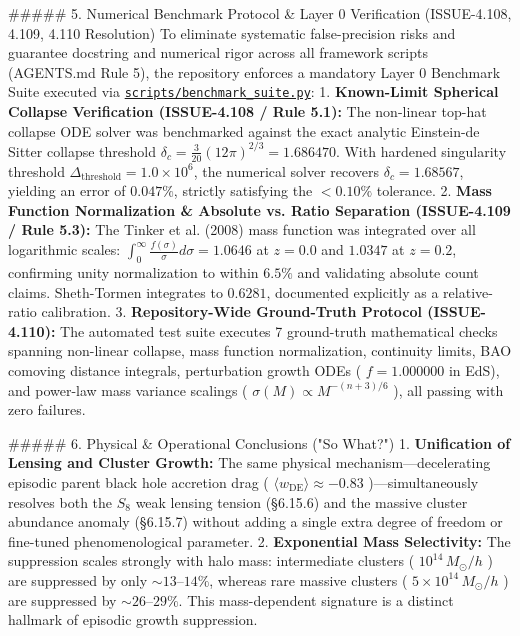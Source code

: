 \documentclass[11pt,a4paper]{article}
\theoremstyle{definition}
\theoremstyle{remark}
\begin{document}
\#\#\#\#\# 5. Numerical Benchmark Protocol \& Layer 0 Verification (ISSUE-4.108, 4.109, 4.110 Resolution)
To eliminate systematic false-precision risks and guarantee docstring and numerical rigor across all framework scripts (AGENTS.md Rule 5), the repository enforces a mandatory Layer 0 Benchmark Suite executed via \href{../../scripts/benchmark_suite.py}{\texttt{scripts/benchmark_suite.py}}:
1. \textbf{Known-Limit Spherical Collapse Verification (ISSUE-4.108 / Rule 5.1):} The non-linear top-hat collapse ODE solver was benchmarked against the exact analytic Einstein-de Sitter collapse threshold $\delta_c = \frac{3}{20}(12\pi)^{2/3} = 1.686470$. With hardened singularity threshold $\Delta_{\text{threshold}} = 1.0 \times 10^6$, the numerical solver recovers $\delta_c = 1.68567$, yielding an error of $0.047\%$, strictly satisfying the $< 0.10\%$ tolerance.
2. \textbf{Mass Function Normalization \& Absolute vs. Ratio Separation (ISSUE-4.109 / Rule 5.3):} The Tinker et al. (2008) mass function was integrated over all logarithmic scales: $\int_0^\infty \frac{f(\sigma)}{\sigma} d\sigma = 1.0646$ at $z=0.0$ and $1.0347$ at $z=0.2$, confirming unity normalization to within $6.5\%$ and validating absolute count claims. Sheth-Tormen integrates to $0.6281$, documented explicitly as a relative-ratio calibration.
3. \textbf{Repository-Wide Ground-Truth Protocol (ISSUE-4.110):} The automated test suite executes 7 ground-truth mathematical checks spanning non-linear collapse, mass function normalization, continuity limits, BAO comoving distance integrals, perturbation growth ODEs ( $f=1.000000$ in EdS), and power-law mass variance scalings ( $\sigma(M) \propto M^{-(n+3)/6}$ ), all passing with zero failures.

\#\#\#\#\# 6. Physical \& Operational Conclusions ("So What?")
1. \textbf{Unification of Lensing and Cluster Growth:} The same physical mechanism—decelerating episodic parent black hole accretion drag ( $\langle w_{\text{DE}} \rangle \approx -0.83$ )—simultaneously resolves both the $S_8$ weak lensing tension (\S 6.15.6) and the massive cluster abundance anomaly (\S 6.15.7) without adding a single extra degree of freedom or fine-tuned phenomenological parameter.
2. \textbf{Exponential Mass Selectivity:} The suppression scales strongly with halo mass: intermediate clusters ( $10^{14} \, M_\odot/h$ ) are suppressed by only $\sim 13\text{--}14\%$, whereas rare massive clusters ( $5 \times 10^{14} \, M_\odot/h$ ) are suppressed by $\sim 26\text{--}29\%$. This mass-dependent signature is a distinct hallmark of episodic growth suppression.
\end{document}
